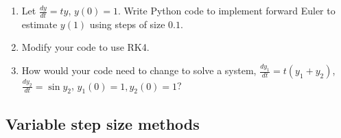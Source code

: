 \documentclass[12pt,letterpaper,noanswers]{exam}
\begin{document}
    
    
    
    

\begin{enumerate}[resume]
\item Let $\frac{dy}{dt} = ty$, $y(0) = 1$.  Write Python code to implement forward Euler to estimate $y(1)$ using steps of size $0.1$.
\vspace{1in}

\item Modify your code to use RK4.
\vspace{1in}

\item How would your code need to change to solve a system, $\frac{dy_1}{dt} = t(y_1+y_2)$, $\frac{dy_2}{dt} = \sin y_2$, $y_1(0) = 1, y_2(0) = 1$?
\end{enumerate}

\subsection*{Variable step size methods}




\end{document}
